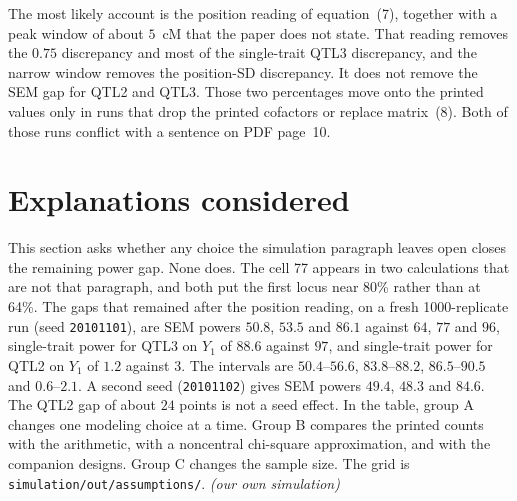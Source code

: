 \documentclass[11pt]{article}
\newcommand{\ev}[1]{\textup{\emph{(#1)}}}
\begin{document}
The most likely account is the position reading of equation~(7), together with
a peak window of about $5$~cM that the paper does not state. That reading
removes the $0.75$ discrepancy and most of the single-trait QTL3 discrepancy,
and the narrow window removes the position-SD discrepancy. It does not
remove the SEM gap for QTL2 and QTL3. Those two percentages move onto the
printed values only in runs that drop the printed cofactors or replace
matrix~(8). Both of those runs conflict with a sentence on PDF page~10.

\section{Explanations considered}
\label{sec:explanations}

This section asks whether any choice the simulation paragraph leaves open
closes the remaining power gap. None does. The cell 77 appears in two
calculations that are not that paragraph, and both put the first locus near
80\% rather than at 64\%. The gaps that remained after the position reading, on a fresh 1000-replicate
run (seed \texttt{20101101}), are SEM powers $50.8$, $53.5$ and $86.1$
against $64$, $77$ and $96$, single-trait power for QTL3 on $Y_1$ of $88.6$
against $97$, and single-trait power for QTL2 on $Y_1$ of $1.2$ against $3$.
The intervals are $50.4$--$56.6$, $83.8$--$88.2$, $86.5$--$90.5$ and
$0.6$--$2.1$. A second seed (\texttt{20101102}) gives SEM powers $49.4$,
$48.3$ and $84.6$. The QTL2 gap of about $24$ points is not a seed effect.
In the table, group A changes one modeling choice at a time. Group B
compares the printed counts with the arithmetic, with a noncentral
chi-square approximation, and with the companion designs. Group C changes
the sample size. The grid is
\texttt{simulation/out/assumptions/}. \ev{our own simulation}
\end{document}
